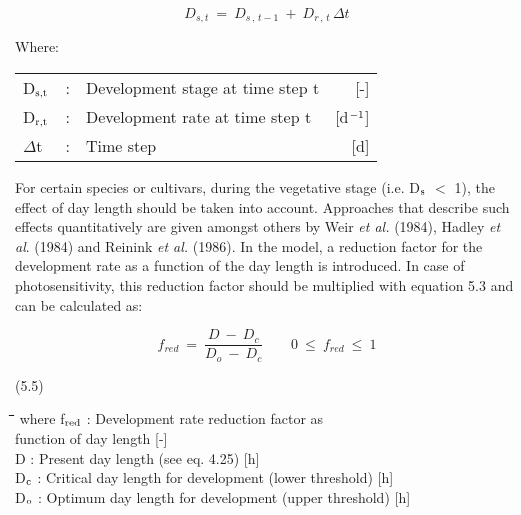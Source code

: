 \begin{equation}
D _{s,t} ~=~ D _{s\, ,\, t-1} ~+~ D _{r\, ,\, t} \,\Delta t
\end{equation}

Where:\\
\begin{tabularx}{\textwidth}{llXr}
D$_{{\rm s,t}}$ &:& Development stage at time step t    &    [-]\\
D$_{{\rm r,t}}$ &:& Development rate at time step t     &   [d$^{{\rm -1}}$]\\
$\Delta$t &:& Time step   &     [d]\\
\end{tabularx}

For certain species or cultivars, during the vegetative stage (i.e. D$_{{\rm s}}$ $<$ 1), the effect of
day len\-gth should be taken into account. Approaches that describe such effects quantita\-tively are given amongst others by  Weir {\it et al.\/} (1984), Hadley {\it et al\/}. (1984) and Reinink {\it et al.\/} (1986). In the model, a reduction factor for the development rate as a function of the day length is intro\-duced. In case of photosensitivity, this reduction factor should be multiplied with equation 5.3 and can be calculated as:

\begin{equation}
f _{red} ~=~{\frac{D ~-~D _{c} }{D _{o} ~-~ D _{c} }} ~~~~~~~~~0~\le ~f _{red} ~\le ~1
\end{equation}

 
\strut\hfill (5.5)

\nwln
\begin{tabbing}
\hspace{1.27cm}\=\hspace{1.27cm}\=\hspace{1.27cm}\=\hspace{1.27cm}\=%
\hspace{1.27cm}\=\hspace{1.27cm}\=\hspace{1.27cm}\=\hspace{1.27cm}\=%
\hspace{1.27cm}\=\hspace{1.27cm}\=\kill
where f$_{{\rm red}}$ : Development rate reduction factor as \\
   function of day length        [-]\\
D : Present day length (see eq. 4.25)        [h]\\
D$_{{\rm c}}$ : Critical day length for development (lower threshold)        [h]\\
D$_{{\rm o}}$ : Optimum day length for development (upper threshold)        [h]
\end{tabbing}


